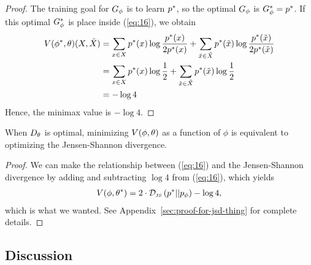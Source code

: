 \begin{proof}
  The training goal for $G_\phi$ is to learn $p^*$, so the optimal $G_\phi$ is $G_\phi^* =
  p^*$. If this optimal $G_\phi^*$ is place inside (\ref{eq:16}), we obtain
  \begin{align}
    \label{eq:side-note}
    V(\phi^*, \theta)(X, \tilde{X}) & = \sum_{x \in X}p^*(x) \log{p^*(x)\over 2 p^*(x)} + \sum_{\tilde{x} \in \tilde{X}}p^*(\tilde{x}) \log{ p^*(\tilde{x}) \over 2 p^*(\tilde{x})} \\
                      & = \sum_{x \in X} p^*(x) \log {1 \over 2} + \sum_{\tilde{x} \in \tilde{X}} p^*(\tilde{x}) \log {1 \over 2} \\
                      & = -\log{4}
  \end{align}
  Hence, the minimax value is $ - \log{4}$.
\end{proof}

\begin{theorem}
  \label{thm:limiting}
  When $D_\theta$ is optimal, minimizing $V(\phi, \theta)$ as a function of $\phi$ is equivalent to
  optimizing the Jensen-Shannon divergence.
\end{theorem}

\begin{proof}
  We can make the relationship between (\ref{eq:16}) and the
  Jensen-Shannon divergence by adding and subtracting $\log{4}$ from
  (\ref{eq:16}), which yields
  \begin{align}
    \label{eq:desired}
    V(\phi, \theta^*) = 2 \cdot \mathcal{D}_{\text{\tiny JS}}\left(p^*\middle|\middle|p_{\phi}\right) - \log{4},
  \end{align}
  which is what we wanted. See Appendix~\ref{sec:proof-for-jsd-thing} for
  complete details.
\end{proof}

\subsection{Discussion}



